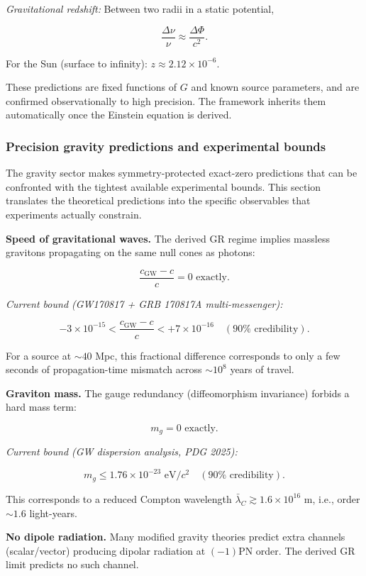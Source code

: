 \emph{Gravitational redshift:} Between two radii in a static potential,

\[
\frac{\Delta\nu}{\nu} \approx \frac{\Delta\Phi}{c^2}.
\]

For the Sun (surface to infinity): \(z \approx 2.12 \times 10^{-6}\).

These predictions are fixed functions of \(G\) and known source parameters, and are confirmed observationally to high precision. The framework inherits them automatically once the Einstein equation is derived.

\subsubsection{Precision gravity predictions and experimental bounds}\label{513-precision-gravity-predictions-and-experimental-bounds}

The gravity sector makes symmetry-protected exact-zero predictions that can be confronted with the tightest available experimental bounds. This section translates the theoretical predictions into the specific observables that experiments actually constrain.

\textbf{Speed of gravitational waves.} The derived GR regime implies massless gravitons propagating on the same null cones as photons:

\[
\frac{c_{\mathrm{GW}} - c}{c} = 0 \text{ exactly.}
\]

\emph{Current bound (GW170817 + GRB 170817A multi-messenger):}

\[
-3 \times 10^{-15} < \frac{c_{\mathrm{GW}} - c}{c} < +7 \times 10^{-16}
\quad (90\% \text{ credibility}).
\]

For a source at \(\sim 40\) Mpc, this fractional difference corresponds to only a few seconds of propagation-time mismatch across \(\sim 10^8\) years of travel.

\textbf{Graviton mass.} The gauge redundancy (diffeomorphism invariance) forbids a hard mass term:

\[
m_g = 0 \text{ exactly.}
\]

\emph{Current bound (GW dispersion analysis, PDG 2025):}

\[
m_g \le 1.76 \times 10^{-23} \text{ eV}/c^2 \quad (90\% \text{ credibility}).
\]

This corresponds to a reduced Compton wavelength \(\bar{\lambda}_C \gtrsim 1.6 \times 10^{16}\) m, i.e., order \(\sim 1.6\) light-years.

\textbf{No dipole radiation.} Many modified gravity theories predict extra channels (scalar/vector) producing dipolar radiation at \((-1)\)PN order. The derived GR limit predicts no such channel.

